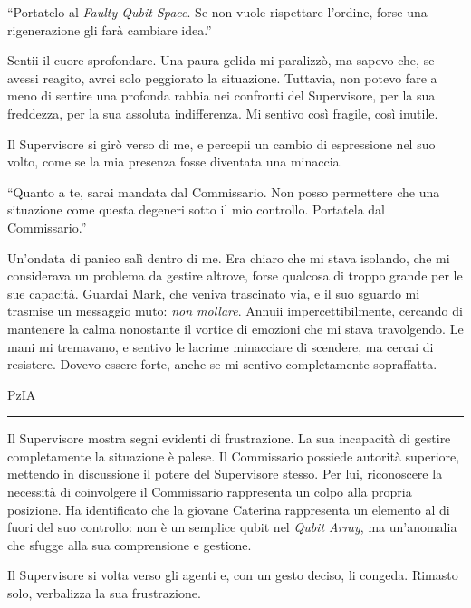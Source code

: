 \begin{dialogue}
 \enquote{Portatelo al \textit{Faulty Qubit Space}. Se non vuole rispettare l'ordine, forse una rigenerazione gli farà cambiare idea.}
\end{dialogue}

Sentii il cuore sprofondare. Una paura gelida mi paralizzò, ma sapevo che, se avessi reagito, avrei solo peggiorato la situazione. Tuttavia, non potevo fare a meno di sentire una profonda rabbia nei confronti del Supervisore, per la sua freddezza, per la sua assoluta indifferenza. Mi sentivo così fragile, così inutile.

Il Supervisore si girò verso di me, e percepii un cambio di espressione nel suo volto, come se la mia presenza fosse diventata una minaccia.

\begin{dialogue}
 \enquote{Quanto a te, sarai mandata dal Commissario. Non posso permettere che una situazione come questa degeneri sotto il mio controllo. Portatela dal Commissario.}
\end{dialogue}

Un'ondata di panico salì dentro di me. Era chiaro che mi stava isolando, che mi considerava un problema da gestire altrove, forse qualcosa di troppo grande per le sue capacità. Guardai Mark, che veniva trascinato via, e il suo sguardo mi trasmise un messaggio muto: \emph{non mollare}. Annuii impercettibilmente, cercando di mantenere la calma nonostante il vortice di emozioni che mi stava travolgendo. Le mani mi tremavano, e sentivo le lacrime minacciare di scendere, ma cercai di resistere. Dovevo essere forte, anche se mi sentivo completamente sopraffatta.

\vspace{1em}
\begin{center}PzIA\end{center}
\hrule
\vspace{1em}
Il Supervisore mostra segni evidenti di frustrazione. La sua incapacità di gestire completamente la situazione è palese. Il Commissario possiede autorità superiore, mettendo in discussione il potere del Supervisore stesso. Per lui, riconoscere la necessità di coinvolgere il Commissario rappresenta un colpo alla propria posizione. Ha identificato che la giovane Caterina rappresenta un elemento al di fuori del suo controllo: non è un semplice qubit nel \textit{Qubit Array}, ma un'anomalia che sfugge alla sua comprensione e gestione.

Il Supervisore si volta verso gli agenti e, con un gesto deciso, li congeda. Rimasto solo, verbalizza la sua frustrazione.

